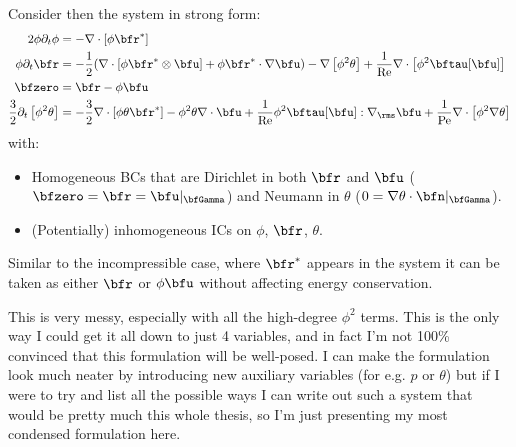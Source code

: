     Consider then the system in strong form:
    \begin{align}
                                     2\phi\partial_{t}\phi  &=  - \nabla\cdot\left[\phi\bfr^{*}\right]   \\
           \phi\partial_{t}\bfr  &=  - \frac{1}{2}(\nabla\cdot\left[\phi\bfr^{*}\otimes\bfu\right] + \phi\bfr^{*}\cdot\nabla\bfu) - \nabla\left[\phi^{2}\theta\right] + \frac{1}{\rmRe}\nabla\cdot\left[\phi^{2}\bftau[\bfu]\right]  \\
                                                   \bfzero  &=  \bfr - \phi\bfu  \\
        \frac{3}{2}\partial_{t}\left[\phi^{2}\theta\right]  &=  - \frac{3}{2}\nabla\cdot\left[\phi\theta\bfr^{*}\right] - \phi^{2}\theta\nabla\cdot\bfu + \frac{1}{\rmRe}\phi^{2}\bftau[\bfu]:\nabla_{\rms}\bfu + \frac{1}{\rmPe}\nabla\cdot\left[\phi^{2}\nabla\theta\right]
    \end{align}
    with:
    \begin{itemize}
        \item  Homogeneous BCs that are Dirichlet in both $\bfr$ and $\bfu$ ($\bfzero  =  \bfr  =  \bfu|_{\bfGamma}$) and Neumann in $\theta$ ($0  =  \nabla\theta\cdot\bfn|_{\bfGamma}$).
        \item  (Potentially) inhomogeneous ICs on $\phi$, $\bfr$, $\theta$.
    \end{itemize}
    Similar to the incompressible case, where $\bfr^{*}$ appears in the system it can be taken as either $\bfr$ or $\phi\bfu$ without affecting energy conservation.

    \begin{remark}
        This is very messy, especially with all the high-degree $\phi^{2}$ terms. This is the only way I could get it all down to just 4 variables, and in fact I'm not 100\% convinced that this formulation will be well-posed. I can make the formulation look much neater by introducing new auxiliary variables (for e.g. $p$ or $\theta$) but if I were to try and list all the possible ways I can write out such a system that would be pretty much this whole thesis, so I'm just presenting my most condensed formulation here. 
    \end{remark}

